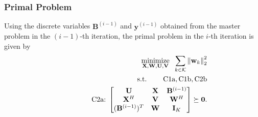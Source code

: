 \documentclass[12pt, draftclsnofoot, onecolumn]{IEEEtran}
\DeclareMathOperator{\mino}{minimize}
\begin{document}
\subsubsection{Primal Problem}
Using the discrete variables $\mathbf{B}^{(i-1)}$ and $\mathbf{y}^{(i-1)}$ obtained from the master problem in the $(i-1)$-th iteration, the primal problem in the $i$-th iteration is given by
\begin{eqnarray}
\label{Primal_problem}
    &&\hspace*{-6mm}\underset{\mathbf{X},\mathbf{W},\mathbf{U},\mathbf{V}}{\mino}\hspace*{2mm}\sum_{k\in\mathcal{K}}\left\|\mathbf{w}_k\right\|_2^2\notag\\
    &&\hspace*{0mm}\mbox{s.t.}\hspace*{8mm} \mbox{C1a}, \mbox{C1b},{\mbox{C2b}}\\
    &&\hspace*{13mm}\mbox{C2a:}\hspace*{1mm}\begin{bmatrix}
    \mathbf{U} & \mathbf{X} & \mathbf{B}^{(i-1)} \\
    \mathbf{X}^H & \mathbf{V} & \mathbf{W}^H \\
    (\mathbf{B}^{(i-1)})^T & \mathbf{W} & \mathbf{I}_K \\
    \end{bmatrix}\succeq \mathbf{0}.\notag

\end{eqnarray}
\end{document}
